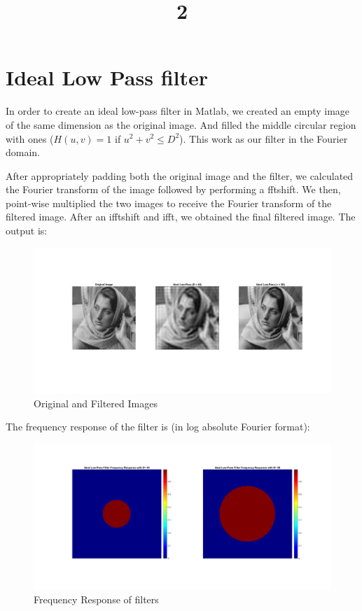 \documentclass[a4paper]{article}
\title{2}
\date{}
\begin{document}
\maketitle

\section{Ideal Low Pass filter}
In order to create an ideal low-pass filter in Matlab, we created an empty image of the same dimension as the original image. And filled the middle circular region with ones ($H(u,v) = 1$ if $u^2 + v^2 \leq D^2$). This work as our filter in the Fourier domain.

After appropriately padding both the original image and the filter, we calculated the Fourier transform of the image followed by performing a fftshift.
We then, point-wise multiplied the two images to receive the Fourier transform of the filtered image. After an ifftshift and ifft, we obtained the final filtered image. The output is:

\begin{figure}[h]
    \centering
    \includegraphics[width=\linewidth]{img1.png}
    \caption{Original and Filtered Images}
\end{figure}

The frequency response of the filter is (in log absolute Fourier format):
\begin{figure}[h]
    \centering
    \includegraphics[width=.5\linewidth]{img3.png}
    \caption{Frequency Response of filters}
\end{figure}
\end{document}
